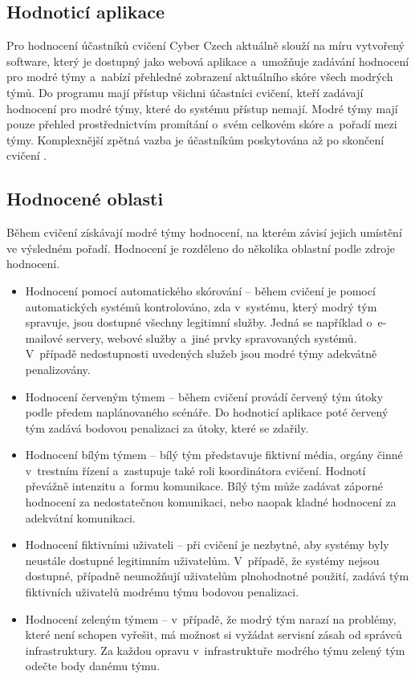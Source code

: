 \documentclass[
  digital,
  twoside,
  table, 
  nolof, 
  nolot
]{fithesis3}
\begin{document}
\subsection{Hodnoticí aplikace}
Pro hodnocení účastníků cvičení Cyber Czech aktuálně slouží na míru vytvořený software, který je dostupný jako webová aplikace a~umožňuje zadávání hodnocení pro modré týmy a~nabízí přehledné zobrazení aktuálního skóre všech modrých týmů. Do programu mají přístup všichni účastníci cvičení, kteří zadávají hodnocení pro modré týmy, které do systému přístup nemají. Modré týmy mají pouze přehled prostřednictvím promítání o~svém celkovém skóre a~pořadí mezi týmy. Komplexnější zpětná vazba je účastníkům poskytována až po skončení cvičení \cite{Vykopal2017TimelyExercises}.

\subsection{Hodnocené oblasti}
Během cvičení získávají modré týmy hodnocení, na kterém závisí jejich umístění ve výsledném pořadí. Hodnocení je rozděleno do několika oblastní podle zdroje hodnocení.

\begin{itemize}
\item Hodnocení pomocí automatického skórování -- během cvičení je pomocí automatických systémů kontrolováno, zda v~systému, který modrý tým spravuje, jsou dostupné všechny legitimní služby. Jedná se například o~e-mailové servery, webové služby a~jiné prvky spravovaných systémů. V~případě nedostupnosti uvedených služeb jsou modré týmy adekvátně penalizovány.
\item Hodnocení červeným týmem -- během cvičení provádí červený tým útoky podle předem naplánovaného scénáře. Do hodnoticí aplikace poté červený tým zadává bodovou penalizaci za útoky, které se zdařily.
\item Hodnocení bílým týmem -- bílý tým představuje fiktivní média, orgány činné v~trestním řízení a~zastupuje také roli koordinátora cvičení. Hodnotí převážně intenzitu a~formu komunikace. Bílý tým může zadávat záporné hodnocení za nedostatečnou komunikaci, nebo naopak kladné hodnocení za adekvátní komunikaci.
\item Hodnocení fiktivními uživateli -- při cvičení je nezbytné, aby systémy byly neustále dostupné legitimním uživatelům. V~případě, že systémy nejsou dostupné, případně neumožňují uživatelům plnohodnotné použití, zadává tým fiktivních uživatelů modrému týmu bodovou penalizaci.
\item Hodnocení zeleným týmem -- v~případě, že modrý tým narazí na problémy, které není schopen vyřešit, má možnost si vyžádat servisní zásah od správců infrastruktury. Za každou opravu v~infrastruktuře modrého týmu zelený tým odečte body danému týmu.
\end{itemize}
\end{document}
